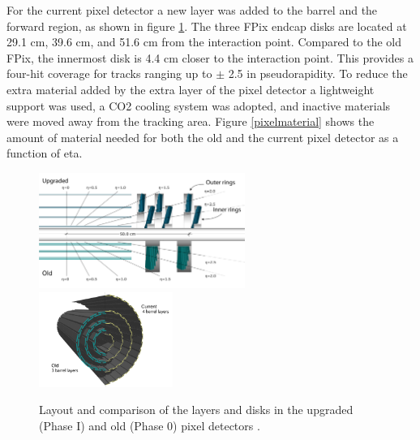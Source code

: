 

For the current pixel detector a new layer was added to the barrel and the forward region, as shown in figure \ref{pixeloldandnew}. The three FPix endcap disks are located at 29.1 cm, 39.6 cm, and 51.6 cm from the interaction point. Compared to the old FPix, the innermost disk is 4.4 cm closer to the interaction point. This provides a four-hit coverage for tracks ranging up to $\pm$ 2.5 in pseudorapidity. To reduce the extra material added by the extra layer of the pixel detector a lightweight support was used, a CO2 cooling system was adopted, and inactive materials were moved away from the tracking area. %
Figure \ref{pixelmaterial} shows the amount of material needed for both the old and the current pixel detector as a function of eta.


\begin{figure}[!h]
	\centering
	\includegraphics[width=0.6\textwidth]{../images/ch7/fpix.pdf}
	\includegraphics[width=0.39\textwidth]{../images/ch7/bpix.pdf}
	\caption[Layout of the upgraded and old pixel detectors.]{Layout and comparison of the layers and disks in the upgraded (Phase I) and old (Phase 0) pixel detectors \cite{pix_tdr}.}
	\label{pixeloldandnew}
\end{figure}




